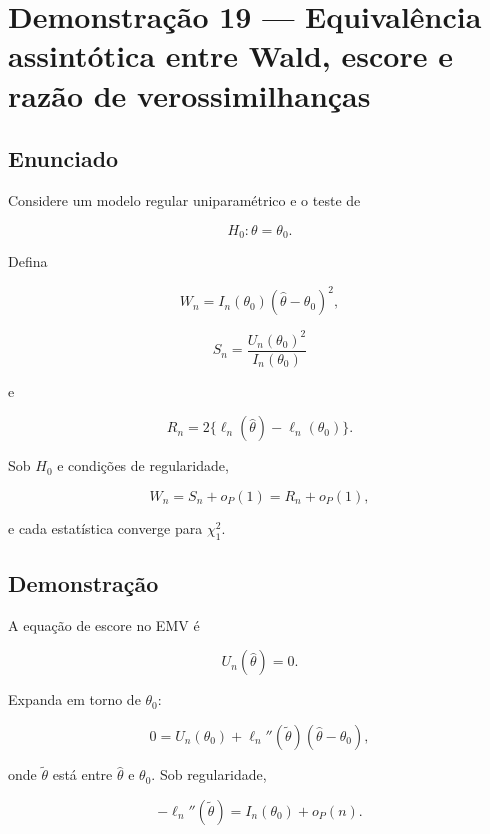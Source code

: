 \documentclass[
  letterpaper,
  DIV=11,
  numbers=noendperiod]{scrreprt}
\begin{document}
\section*{Demonstração 19 --- Equivalência assintótica entre Wald,
escore e razão de
verossimilhanças}\label{demonstrauxe7uxe3o-19-equivaluxeancia-assintuxf3tica-entre-wald-escore-e-razuxe3o-de-verossimilhanuxe7as}


\subsection*{Enunciado}\label{enunciado-14}

Considere um modelo regular uniparamétrico e o teste de

\[
H_0:\theta=\theta_0.
\]

Defina

\[
W_n=I_n(\theta_0)(\widehat\theta-\theta_0)^2,
\]

\[
S_n=\frac{U_n(\theta_0)^2}{I_n(\theta_0)}
\]

e

\[
R_n=2\{\ell_n(\widehat\theta)-\ell_n(\theta_0)\}.
\]

Sob \(H_0\) e condições de regularidade,

\[
W_n=S_n+o_P(1)=R_n+o_P(1),
\]

e cada estatística converge para \(\chi^2_1\).

\subsection*{Demonstração}\label{demonstrauxe7uxe3o-15}

A equação de escore no EMV é

\[
U_n(\widehat\theta)=0.
\]

Expanda em torno de \(\theta_0\):

\[
0
=
U_n(\theta_0)
+
\ell_n''(\widetilde\theta)(\widehat\theta-\theta_0),
\]

onde \(\widetilde\theta\) está entre \(\widehat\theta\) e \(\theta_0\).
Sob regularidade,

\[
-\ell_n''(\widetilde\theta)
=
I_n(\theta_0)+o_P(n).
\]
\end{document}

